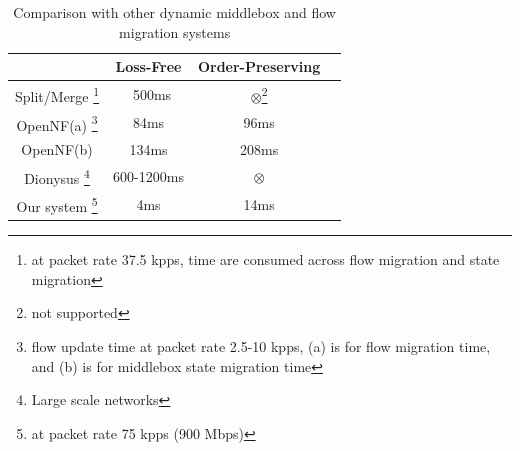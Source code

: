 \begin{table}[ht]
\centering
\small
\begin{tabular} {|c |c | c| c|}

\hline
 &Loss-Free& Order-Preserving \\ \hline 

Split/Merge
\footnote{\scriptsize at packet rate 37.5 kpps, time are consumed across flow migration and state migration} 
		&~500ms&$\otimes$\footnote{\small not supported} \\ \hline
OpenNF(a)
\footnote{\scriptsize flow update time at packet rate 2.5-10 kpps, (a) is for flow migration time, and (b) is for middlebox state migration time} 
	       & 84ms& 96ms\\ \hline
OpenNF(b)      & 134ms& 208ms \\ \hline
Dionysus
\footnote{\scriptsize Large scale networks}
	      &600-1200ms &$\otimes$  \\ \hline
Our system
\footnote{\scriptsize at packet rate 75 kpps (900 Mbps)} 
	    & 4ms &14ms \\ \hline

\end{tabular}
\caption{Comparison with other dynamic middlebox and flow migration systems}\label{latencycomp} 
\end{table}

